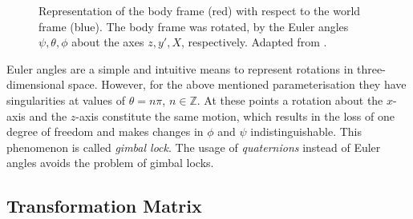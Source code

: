 \begin{figure}
\centering
{}
\caption{Representation of the body frame (red) with respect to the world frame (blue). The body frame was rotated, by the Euler angles $\psi, \theta, \phi$ about the axes $z, y', X$, respectively. Adapted from \cite{Wiki_taitbryan}.} \label{fig:Euler_angles}
\end{figure}

Euler angles are a simple and intuitive means to represent rotations in three-dimensional space. However, for the above mentioned parameterisation they have singularities at values of $\theta = n \pi$, $n \in \mathbb{Z}$. At these points a rotation about the $x$-axis and the $z$-axis constitute the same motion, which results in the loss of one degree of freedom and makes changes in $\phi$ and $\psi$ indistinguishable. This phenomenon is called \emph{gimbal lock}. The usage of \emph{quaternions} instead of Euler angles avoids the problem of gimbal locks.

\subsection{Transformation Matrix}

